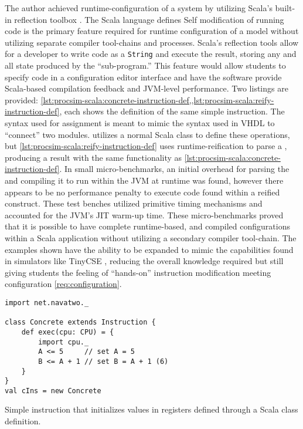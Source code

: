 The author achieved runtime-configuration of a system by utilizing Scala's built-in reflection toolbox \cite{Scala-Reflection}. The Scala language defines  Self modification of running code is the primary feature required for runtime configuration of a model without utilizing separate compiler tool-chains and processes. Scala's reflection tools allow for a developer to write code as a \texttt{String} and execute the result, storing any and all state produced by the ``sub-program.'' This feature would allow students to specify code in a configuration editor interface and have the software provide Scala-based compilation feedback and JVM-level performance. Two listings are provided: \cref{lst:procsim-scala:concrete-instruction-def,,lst:procsim-scala:reify-instruction-def}, each shows the definition of the same simple instruction. The syntax used for assignment is meant to mimic the syntax used in VHDL to ``connect'' two modules.  utilizes a normal Scala class to define these operations, but \cref{lst:procsim-scala:reify-instruction-def} uses runtime-reification to parse a , producing a result with the same functionality as \cref{lst:procsim-scala:concrete-instruction-def}. In small micro-benchmarks, an initial overhead for parsing the  and compiling it to run within the JVM at runtime was found, however there appears to be no performance penalty to execute code found within a reified construct. These test benches utilized primitive timing mechanisms and accounted for the JVM's JIT warm-up time. These micro-benchmarks proved that it is possible to have complete runtime-based, and compiled configurations within a Scala application without utilizing a secondary compiler tool-chain. The examples shown have the ability to be expanded to mimic the capabilities found in simulators like TinyCSE \cite{Nakamura2013, McLoughlin2010}, reducing the overall knowledge required but still giving students the feeling of ``hands-on'' instruction modification meeting configuration \cref{req:configuration}.

\begin{listing}[ht!]
\begin{verbatim}
import net.navatwo._

class Concrete extends Instruction {
    def exec(cpu: CPU) = {
        import cpu._
        A <= 5     // set A = 5
        B <= A + 1 // set B = A + 1 (6)
    }
}
val cIns = new Concrete
\end{verbatim}
\caption{Simple instruction that initializes values in registers defined through a Scala class definition.}
\label{lst:procsim-scala:concrete-instruction-def}
\end{listing}

